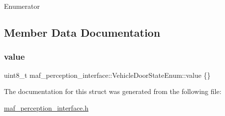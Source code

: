 \begin{DoxyEnumFields}{Enumerator}
\end{DoxyEnumFields}


\subsection{Member Data Documentation}
\mbox{\label{structmaf__perception__interface_1_1VehicleDoorStateEnum_a08907fd70bf3cf5b1d774101a92a096b}} 
\subsubsection{\texorpdfstring{value}{value}}
{\footnotesize\ttfamily uint8\+\_\+t maf\+\_\+perception\+\_\+interface\+::\+Vehicle\+Door\+State\+Enum\+::value \{\}}



The documentation for this struct was generated from the following file\+:\begin{DoxyCompactItemize}
\item 
\hyperlink{maf__perception__interface_8h}{maf\+\_\+perception\+\_\+interface.\+h}\end{DoxyCompactItemize}
